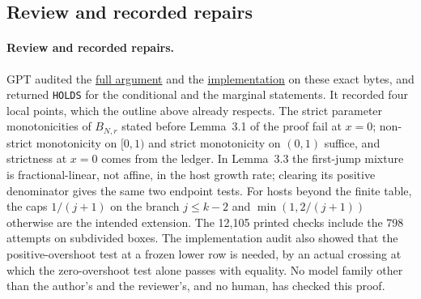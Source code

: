\documentclass[11pt]{article}
\newcommand{\ordersrc}[2]{\href{https://github.com/uzay-eth/friend-tree-exponent/blob/62081cad01112c42c2011ac3eed11aa3aa665e09/#1}{#2}}
\theoremstyle{remark}
\numberwithin{equation}{section}
\begin{document}
\subsection{Review and recorded repairs}\label{sec:ord-review}
\paragraph{Review and recorded repairs.}
GPT audited the \ordersrc{round3/q3-birth-order/REVIEW-Q3.md}{full argument} and the \ordersrc{round3/q3-birth-order/REVIEW-IMPLEMENTATION.md}{implementation} on these exact bytes, and returned \texttt{HOLDS} for the conditional and the marginal statements. It recorded four local points, which the outline above already respects. The strict parameter monotonicities of $B_{N,r}$ stated before Lemma~3.1 of the proof fail at $x=0$; non-strict monotonicity on $[0,1)$ and strict monotonicity on $(0,1)$ suffice, and strictness at $x=0$ comes from the ledger. In Lemma~3.3 the first-jump mixture is fractional-linear, not affine, in the host growth rate; clearing its positive denominator gives the same two endpoint tests. For hosts beyond the finite table, the caps $1/(j+1)$ on the branch $j\le k-2$ and $\min(1,2/(j+1))$ otherwise are the intended extension. The 12{,}105 printed checks include the 798 attempts on subdivided boxes. The implementation audit also showed that the positive-overshoot test at a frozen lower row is needed, by an actual crossing at which the zero-overshoot test alone passes with equality. No model family other than the author's and the reviewer's, and no human, has checked this proof.
\end{document}
